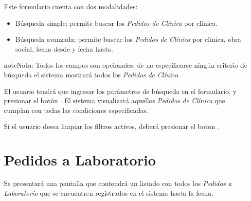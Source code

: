\documentclass[a4paper,10pt,spanish]{sphinxmanual}
\begin{document}

Este formulario cuenta con dos modalidades:
\begin{itemize}
\item {} 
Búsqueda simple: permite buscar los \emph{Pedidos de Clínica} por clínica.

\item {} 
Búsqueda avanzada: permite buscar los \emph{Pedidos de Clínica} por clínica, obra social, fecha desde y fecha hasta.

\end{itemize}

\begin{notice}{note}{Nota:}
Todos los campos son opcionales, de no especificarse ningún criterio de búsqueda el sistema mostrará todos los \emph{Pedidos de Clínica}.
\end{notice}

El usuario tendrá que ingresar los parámetros de búsqueda en el formulario, y presionar el botón . El sistema visualizará aquellos \emph{Pedidos de Clínica} que cumplan con todas las condiciones especificadas.

Si el usuario desea limpiar los filtros activos, deberá presionar el boton .



\section{Pedidos a Laboratorio}
\label{pedidosalab:pedidos-a-laboratorio}\label{pedidosalab::doc}
Se presentará una pantalla que contendrá un listado con todos los \emph{Pedidos a Laboratorio} que se encuentren registrados en el sistema hasta la fecha.

\end{document}
